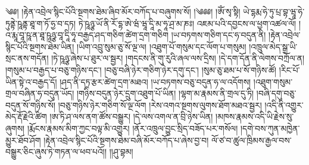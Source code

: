 \setcounter{footnote}{0} 
༄༅། །རྟེན་འབྲེལ་སྙིང་པོའི་སྔགས་ཐེམ་ཞིབ་མོར་བཀོད་པ་བཞུགས་སོ། །༄༅༅། །ཨོཾ་སྭ་སྟི། ཡེ་དྷརྨ་ཧེ་ཏུ་པྲ་བྷ་ཝཱ་ཧེ་ཏུནྟེ་ཥཱནྟ་ཐཱ་ག་ཏོ་ཧྱ་བ་དཏ། ཏེ་ཥཱཉྩ་ཡོ་ནི་རོ་དྷ་ཨེ་ཝཾ་ཝཱ་དཱི་མ་ཧཱ་ཤྲ་མ་ཎཿ། འཇམ་པའི་དབྱངས་ལ་ཕྱག་འཚལ་ལོ། །འ་རྨཱ་བཱ་ཥཱ་ན་ཐཱ་ཥཱཉྩ་བཱ་དཱི་ཧཱ་བརྒྱད་ཤད་གཅིག་ཚེག་དྲག་གཅིག །ཡ་བཏགས་གཅིག་དང་ཧ་བདུན་ནི། །རྟེན་འབྲེལ་སྙིང་པོའི་སྔགས་ཐེམ་ཡིན། །ཡིག་འབྲུ་སུམ་ཅུ་སོ་ལྔ་ལ། །འཐུག་པོ་གསུམ་དང་ལོག་པ་གསུམ། །འཁྲུལ་མེད་སྒྲ་ཡི་སྲང་ནས་གདོན། །ཏེ་ཥཱཉྩ་ཞེས་པ་ཐུར་ལ་སྦྱར། །གདངས་ནི་གུ་རུའི་ཞལ་ལས་དྲིས། །དེ་དག་དོན་ནི་ལེགས་བཀྲོལ་ན། །གསུམ་པ་བརྒྱད་པ་བཅུ་གཉིས་དང་། །བཅུ་བཞི་ཉེར་གཅིག་ཉེར་དགུ་དང་། །སུམ་ཅུ་ཐམ་པ་སོ་གཉིས་ཚོ། །རིང་པོ་ཡིན་སྟེ་འ་བརྒྱད་དོ། །ཤད་ནི་དཏྲ་རྩར་ཚེག་དྲག་མཐའ། །ཡ་བཏགས་བཅུ་བདུན་ཧ་ལ་འདོགས། །འཐུག་གསུམ་གྲལ་བཞིན་ཧ་བདུན་ཡོད། །གཉིས་བདུན་ཉེར་དྲུག་འཐུག་པོ་ཡིན། །ལྷག་མ་རྣམས་ནི་གྲལ་དུ་ཏི། །བཞི་དགུ་བཅུ་བདུན་སོ་གཉིས་སོ། །བཅུ་གཉིས་ཉེར་གཅིག་སོ་ལྔ་ལོག །རེས་འགའ་སྔགས་ལུགས་ཐོག་མཐའ་སྦྱར། །འདི་ནི་འགྱུར་མེད་རྡོ་རྗེའི་ཚིག །ཨ་ཏི་ཤ་ལས་ནག་ཚོས་བསྒྱུར། །དེ་ལས་འགལ་ན་བྲི་ཉེས་ཡིན། །མཁས་རྣམས་འདི་ཡི་རྗེས་སུ་ཞུགས། །རྨོངས་རྣམས་མིག་ཀྱང་བལྟ་མི་འགྱུར། །ནོར་འཁྲུལ་བྱུང་སྲིད་བཟོད་པར་གསོལ། །དགེ་བས་ཀུན་མཁྱེན་མྱུར་ཐོབ་ཤོག །རྟེན་འབྲེལ་སྙིང་པོའི་སྔགས་ཐེམ་བཞི་མོར་བཀོད་པ་ཞེས་བྱ་བ། ལོ་ཙ་བ་ཚུལ་ཁྲིམས་རྒྱལ་བས་བསྒྱུར་ཅིང་ཞུས་ཏེ་གཏན་ལ་ཕབ་པའོ།། །།ཤུ་བྷམ།